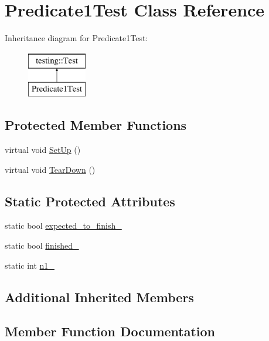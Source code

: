 \hypertarget{classPredicate1Test}{}\section{Predicate1\+Test Class Reference}
\label{classPredicate1Test}
Inheritance diagram for Predicate1\+Test\+:\begin{figure}[H]
\begin{center}
\leavevmode
\includegraphics[height=2.000000cm]{classPredicate1Test}
\end{center}
\end{figure}
\subsection*{Protected Member Functions}
\begin{DoxyCompactItemize}
\item 
virtual void \mbox{\hyperlink{classPredicate1Test_a481704a09f73a37158513f9a336dbdd9}{Set\+Up}} ()
\item 
virtual void \mbox{\hyperlink{classPredicate1Test_ad2974af5c6abc508847c3a9912b24a90}{Tear\+Down}} ()
\end{DoxyCompactItemize}
\subsection*{Static Protected Attributes}
\begin{DoxyCompactItemize}
\item 
static bool \mbox{\hyperlink{classPredicate1Test_ad91cfa58e6352d53abacce32df2ef635}{expected\+\_\+to\+\_\+finish\+\_\+}}
\item 
static bool \mbox{\hyperlink{classPredicate1Test_a6d45fb2d1f01a5c8baf28f60039c244e}{finished\+\_\+}}
\item 
static int \mbox{\hyperlink{classPredicate1Test_a528d9f7f618b17802962a3824eea11e3}{n1\+\_\+}}
\end{DoxyCompactItemize}
\subsection*{Additional Inherited Members}


\subsection{Member Function Documentation}
\mbox{\label{classPredicate1Test_a481704a09f73a37158513f9a336dbdd9}} 
